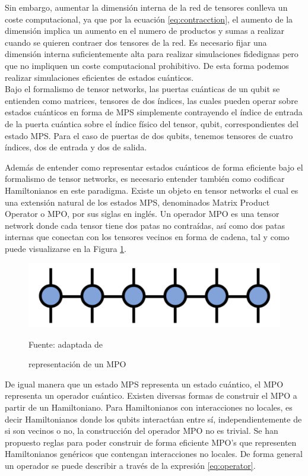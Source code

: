 Sin embargo, aumentar la dimensión interna de la red de tensores conlleva un coste computacional, ya que por la ecuación \ref{eq:contracction}, el aumento de la dimensión implica un aumento en el numero de productos y sumas a realizar cuando se quieren contraer dos tensores de la red. Es necesario fijar una dimensión interna suficientemente alta para realizar simulaciones fidedignas pero que no impliquen un coste computacional prohibitivo. De esta forma podemos realizar simulaciones eficientes de estados cuánticos. \\

Bajo el formalismo de tensor networks, las puertas cuánticas de un qubit se entienden como matrices, tensores de dos índices, las cuales pueden operar sobre estados cuánticos en forma de MPS simplemente contrayendo el índice de entrada de la puerta cuántica sobre el índice físico del tensor, qubit, correspondientes del estado MPS. Para el caso de puertas de dos qubits, tenemos tensores de cuatro índices, dos de entrada y dos de salida. \\

\newpage

Además de entender como representar estados cuánticos de forma eficiente bajo el formalismo de tensor networks, es necesario entender también como codificar Hamiltonianos en este paradigma. Existe un objeto en tensor networks el cual es una extensión natural de los estados MPS, denominados Matrix Product Operator o MPO, por sus siglas en inglés. Un operador MPO es una tensor network donde cada tensor tiene dos patas no contraídas, así como dos patas internas que conectan con los tensores vecinos en forma de cadena, tal y como puede visualizarse en la Figura \ref{fig:mpo}.


\begin{figure}[!ht]
    \centering
    \includegraphics[scale = 0.35]{img/03-mpo.png}
    \caption{representación de un MPO}
    Fuente: adaptada de \cite{tn} 
    \label{fig:mpo}
\end{figure}

De igual manera que un estado MPS representa un estado cuántico, el MPO representa un operador cuántico. Existen diversas formas de construir el MPO a partir de un Hamiltoniano. Para Hamiltonianos con interacciones no locales, es decir Hamiltonianos donde los qubits interactúan entre sí, independientemente de si son vecinos o no, la construcción del operador MPO no es trivial. Se han propuesto reglas \citep{fröwis} para poder construir de forma eficiente MPO's que representen Hamiltonianos genéricos que contengan interacciones no locales. De forma general un operador se puede describir a través de la expresión \ref{eq:operator}.

